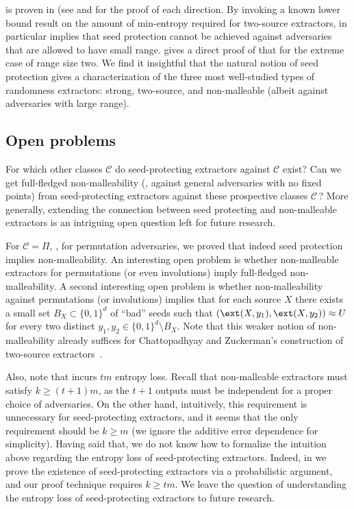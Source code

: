 \documentclass{toc}
\begin{document}
 is proven in  (see  and  for the proof of each direction. %
By invoking a known lower bound result on the amount of min-entropy required for two-source extractors,  in particular implies that seed protection cannot be achieved against adversaries that are allowed to have small range.  gives a direct proof of that for
%
%
the  %
extreme case of range size two. We find it insightful that the
%
natural notion of seed protection gives a characterization of the three most well-studied types of randomness extractors: strong, two-source, and non-malleable (albeit against adversaries with large range).



\subsection{Open problems}

For which other classes $\mathcal{C}$ do seed-protecting extractors against $\mathcal{C}$ exist?
Can we get full-fledged non-malleability (\ie,
against general adversaries with no fixed points) from seed-protecting extractors against these prospective %
%
classes $\mathcal C\,$?
More generally, extending the connection between seed protecting and non-malleable extractors is an intriguing open question left for future research.

%
%
%
%
%

For $\mathcal{C} = \Pi$, \ie, for permutation adversaries, we proved that indeed seed protection implies 
non-malleability. An interesting open problem is whether non-malleable extractors for permutations (or even involutions) imply full-fledged non-malleability.
A second interesting open problem is whether non-malleability against permutations (or involutions) implies that for each source $X$ there exists a small set $B_X \subset \{0,1\}^d$ of
``bad'' seeds such that $(\ext(X,y_1),\ext(X,y_2)) \approx U$ for every two distinct $y_1,y_2 \in \{0,1\}^d \setminus B_X$. Note that this 
weaker notion of non-malleability already suffices for Chattopadhyay and Zuckerman's construction of %
two-source  %
extractors~\cite{CZ19}.

Also, note that  incurs $tm$ entropy loss. Recall that non-malleable extractors must satisfy $k \ge (t+1)m$, as the $t+1$ outputs must be independent for a proper choice of adversaries. On the other hand, intuitively, this requirement is unnecessary for seed-protecting extractors, and it seems that the only requirement should be $k \ge m$ (we ignore the additive error dependence for simplicity).  Having said that, we do not know how to formalize the intuition above regarding the entropy loss of seed-protecting extractors. Indeed, in  we prove the existence of seed-protecting extractors via a probabilistic argument, and our proof technique requires $k \ge tm$. We leave the question of understanding the entropy loss of seed-protecting extractors to future research.
\end{document}

